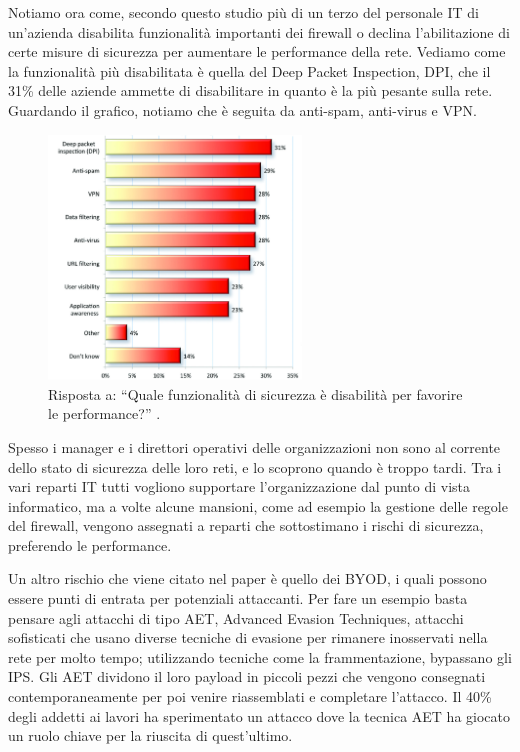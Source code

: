             Notiamo ora come, secondo questo studio \cite{PATEL20159} più di un terzo del personale IT di un'azienda disabilita funzionalità importanti dei firewall o declina l'abilitazione di certe misure di sicurezza per aumentare le performance della rete. Vediamo come la funzionalità più disabilitata è quella del Deep Packet Inspection, DPI, che il 31\% delle aziende ammette di disabilitare in quanto è la più pesante sulla rete. Guardando il grafico, notiamo che è seguita da anti-spam, anti-virus e VPN.
            
             \begin{figure}[H]
                \centering
                \includegraphics[width=0.6\textwidth]{Immagini/most_disable_feat_it_admin.png}
                \caption{Risposta a: “Quale funzionalità di sicurezza è disabilità per favorire le performance?” \cite{intel_sec_mcafee}.}
                \label{fig:disable_feat}
            \end{figure}

            Spesso i manager e i direttori operativi delle organizzazioni non sono al corrente dello stato di sicurezza delle loro reti, e lo scoprono quando è troppo tardi. Tra i vari reparti IT tutti vogliono supportare l'organizzazione dal punto di vista informatico, ma a volte alcune mansioni, come ad esempio la gestione delle regole del firewall, vengono assegnati a reparti che sottostimano i rischi di sicurezza, preferendo le performance.

            Un altro rischio che viene citato nel paper è quello dei BYOD, i quali possono essere punti di entrata per potenziali attaccanti. Per fare un esempio basta pensare agli attacchi di tipo AET, Advanced Evasion Techniques, attacchi sofisticati che usano diverse tecniche di evasione per rimanere inosservati nella rete per molto tempo; utilizzando tecniche come la frammentazione, bypassano gli IPS. Gli AET dividono il loro payload in piccoli pezzi che vengono consegnati contemporaneamente per poi venire riassemblati e completare l'attacco. Il 40\% degli addetti ai lavori ha sperimentato un attacco dove la tecnica AET ha giocato un ruolo chiave per la riuscita di quest'ultimo.

